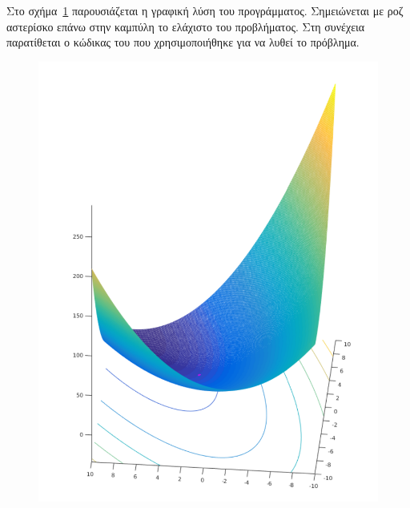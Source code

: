 Στο σχήμα~\ref{fig:qp} παρουσιάζεται η γραφική λύση του προγράμματος. Σημειώνεται
με ροζ αστερίσκο επάνω στην καμπύλη το ελάχιστο του προβλήματος. Στη συνέχεια
παρατίθεται ο κώδικας του  που χρησιμοποιήθηκε για να λυθεί το πρόβλημα.
\newpage
\begin{otherlanguage}{english}
    \begin{figure}[h!]
        \centering
        \includegraphics[width=\textwidth]{figures/qp.pdf}
        \caption{}\label{fig:qp}
    \end{figure}
\end{otherlanguage}

\begin{otherlanguage}{english}
    
\end{otherlanguage}
